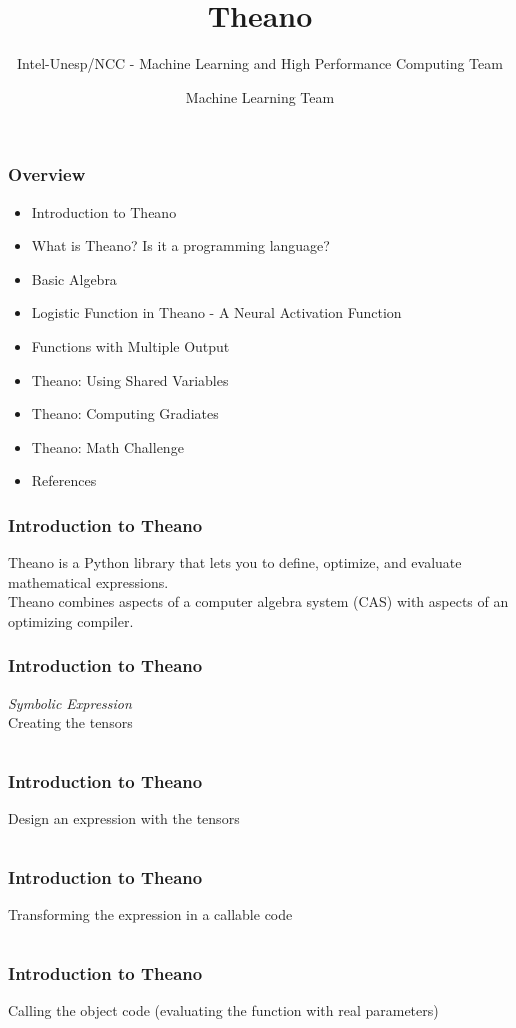 \documentclass[aspectratio=169]{beamer}
\title[Short title]{Theano}
\subtitle{Intel-Unesp/NCC - Machine Learning and High Performance Computing Team}
\author{Machine Learning Team}
\begin{document}
\begin{frame}
\titlepage 
\end{frame}

\begin{frame}
\frametitle{Overview} 
\begin{itemize}
\item Introduction to Theano
\item What is Theano? Is it a programming language?
\item Basic Algebra
\item Logistic Function in Theano - A Neural Activation Function
\item Functions with Multiple Output
\item Theano: Using Shared Variables
\item Theano: Computing Gradiates
\item Theano: Math Challenge
\item References
\end{itemize}
\end{frame}

\begin{frame}
\frametitle{Introduction to Theano}
Theano is a Python library that lets you to define, optimize, and evaluate mathematical expressions.
\\[1.0cm]
Theano combines aspects of a computer algebra system (CAS) with aspects of an optimizing compiler. 
\end{frame}

\begin{frame}
\frametitle{Introduction to Theano}
\emph{Symbolic Expression}
\\[0.5cm]
Creating the tensors
\inputminted{python}{t1.py}
\end{frame}

\begin{frame}
\frametitle{Introduction to Theano}
Design an expression with the tensors
\inputminted{python}{t2.py}
\end{frame}

\begin{frame}
\frametitle{Introduction to Theano}
Transforming the expression in a callable code
\inputminted{python}{t3.py}
\end{frame}

\begin{frame}
\frametitle{Introduction to Theano}
Calling the object code (evaluating the function with real parameters)
\inputminted{python}{t4.py}
\end{frame}
\end{document}
